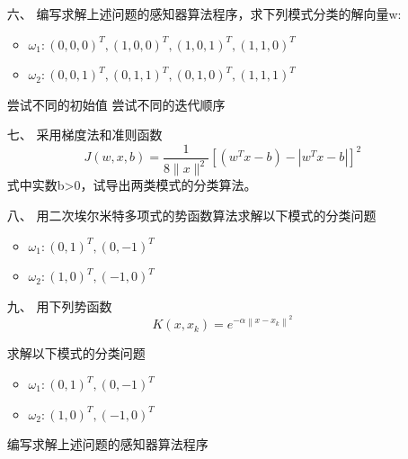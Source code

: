 \documentclass[UTF8,a4paper]{ctexart}
\begin{document}
\begin{itemize}
\begin{itemize}
    \end{itemize}
    
    \item[六、] 编写求解上述问题的感知器算法程序，求下列模式分类的解向量w:
    \begin{itemize}
        \item $\omega _1: {(0 ,0 ,0)^T, (1 ,0 ,0)^T, (1 ,0 ,1)^T, (1 ,1 ,0)^T}$
        \item 
        $\omega _2: {(0 ,0 ,1)^T, (0 ,1, 1)^T, (0, 1 ,0)^T, (1 ,1 ,1)^T}$
    \end{itemize}
    尝试不同的初始值
    尝试不同的迭代顺序


\item[七、] 采用梯度法和准则函数
$$J(w, x, b)=\frac{1}{8\|x\|^{2}}\left[\left(w^{T} x-b\right)-\left|w^{T} x-b\right|\right]^{2}$$
式中实数b>0，试导出两类模式的分类算法。
\item[八、] 用二次埃尔米特多项式的势函数算法求解以下模式的分类问题
\begin{itemize}
    \item $\omega _1: {(0 ,1)^T, (0 ,-1)^T}$
    \item $\omega _2: {(1, 0)^T, (-1, 0)^T}$
\end{itemize}



\item[九、] 用下列势函数
$$
K\left(x, x_{k}\right)=e^{-\alpha\left\|x-x_{k}\right\|^{2}}
$$
	
求解以下模式的分类问题
\begin{itemize}
    \item $\omega _1: {(0 ,1)^T, (0 ,-1)^T}$
    \item $\omega _2: {(1, 0)^T, (-1, 0)^T}$
\end{itemize}
编写求解上述问题的感知器算法程序
\end{itemize}
\end{document}

